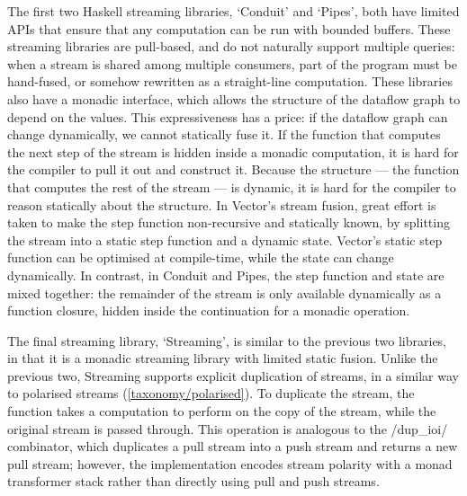 The first two Haskell streaming libraries, `Conduit' and `Pipes', both have limited APIs that ensure that any computation can be run with bounded buffers.
These streaming libraries are pull-based, and do not naturally support multiple queries: when a stream is shared among multiple consumers, part of the program must be hand-fused, or somehow rewritten as a straight-line computation.
These libraries also have a monadic interface, which allows the structure of the dataflow graph to depend on the values.
This expressiveness has a price: if the dataflow graph can change dynamically, we cannot statically fuse it.
If the function that computes the next step of the stream is hidden inside a monadic computation, it is hard for the compiler to pull it out and construct it.
Because the structure --- the function that computes the rest of the stream --- is dynamic, it is hard for the compiler to reason statically about the structure.
In Vector's stream fusion, great effort is taken to make the step function non-recursive and statically known, by splitting the stream into a static step function and a dynamic state.
Vector's static step function can be optimised at compile-time, while the state can change dynamically.
In contrast, in Conduit and Pipes, the step function and state are mixed together: the remainder of the stream is only available dynamically as a function closure, hidden inside the continuation for a monadic operation.

The final streaming library, `Streaming', is similar to the previous two libraries, in that it is a monadic streaming library with limited static fusion.
Unlike the previous two, Streaming supports explicit duplication of streams, in a similar way to polarised streams (\cref{taxonomy/polarised}).
To duplicate the stream, the \Hs@store@ function takes a computation to perform on the copy of the stream, while the original stream is passed through.
This operation is analogous to the \Hs/dup_ioi/ combinator, which duplicates a pull stream into a push stream and returns a new pull stream; however, the implementation encodes stream polarity with a monad transformer stack rather than directly using pull and push streams.



